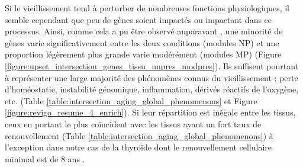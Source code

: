 Si le vieillissement tend à perturber de nombreuses fonctions physiologiques, il semble cependant que peu de gènes soient impactés ou impactant dans ce processus. Ainsi, comme cela a pu être observé auparavant \cite{Avelar2019}, une minorité de gènes varie significativement entre les deux conditions (modules NP) et une proportion légèrement plus grande varie modérément (modules MP) (Figure \ref{figure:upset_intersection_genes_tissu_unpres_modpres}). 
Ils suffisent pourtant à représenter une large majorité des phénomènes connus du vieillissement : perte d'homéostatie, instabilité génomique, inflammation, dérivés réactifs de l'oxygène, etc. (Table \ref{table:intersection_aging_global_phenomenons} et Figure \ref{figure:revigo_resume_4_enrich}). 
Si leur répartition est inégale entre les tissus, ceux en portant le plus coïncident avec les tissus ayant un fort taux de renouvellement \cite{Armanios2012, Barker2010, Leblond1956} (Table \ref{table:intersection_aging_global_phenomenons}) à l'exception dans notre cas de la thyroïde dont le renouvellement cellulaire minimal est de 8 ans \cite{Coclet1989Dec}. 
